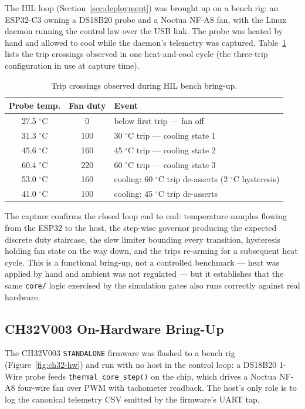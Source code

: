 The HIL loop (Section~\ref{sec:deployment}) was brought up on a bench rig: an ESP32-C3 owning a DS18B20 probe and a Noctua NF-A8 fan, with the Linux daemon running the control law over the USB link. The probe was heated by hand and allowed to cool while the daemon's telemetry was captured. Table~\ref{tab:hil-bringup} lists the trip crossings observed in one heat-and-cool cycle (the three-trip configuration in use at capture time).

\begin{table}[h]
\centering
\begin{tabular}{ccl}
\toprule
\textbf{Probe temp.} & \textbf{Fan duty} & \textbf{Event} \\
\midrule
27.5 $^\circ$C & 0   & below first trip --- fan off \\
31.3 $^\circ$C & 100 & 30 $^\circ$C trip --- cooling state 1 \\
45.6 $^\circ$C & 160 & 45 $^\circ$C trip --- cooling state 2 \\
60.4 $^\circ$C & 220 & 60 $^\circ$C trip --- cooling state 3 \\
53.0 $^\circ$C & 160 & cooling: 60 $^\circ$C trip de-asserts (2 $^\circ$C hysteresis) \\
41.0 $^\circ$C & 100 & cooling: 45 $^\circ$C trip de-asserts \\
\bottomrule
\end{tabular}
\caption{Trip crossings observed during HIL bench bring-up.}
\label{tab:hil-bringup}
\end{table}

The capture confirms the closed loop end to end: temperature samples flowing from the ESP32 to the host, the step-wise governor producing the expected discrete duty staircase, the slew limiter bounding every transition, hysteresis holding fan state on the way down, and the trips re-arming for a subsequent heat cycle. This is a functional bring-up, not a controlled benchmark --- heat was applied by hand and ambient was not regulated --- but it establishes that the same \texttt{core/} logic exercised by the simulation gates also runs correctly against real hardware.

\subsection{CH32V003 On-Hardware Bring-Up}\label{sec:eval-ch32-hw}

The CH32V003 \texttt{STANDALONE} firmware was flashed to a bench rig (Figure~\ref{fig:ch32-hw}) and run with no host in the control loop: a DS18B20 1-Wire probe feeds \texttt{thermal\_core\_step()} on the chip, which drives a Noctua NF-A8 four-wire fan over PWM with tachometer readback. The host's only role is to log the canonical telemetry CSV emitted by the firmware's UART tap.

